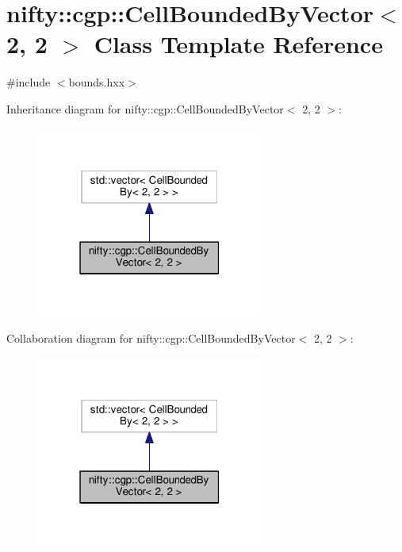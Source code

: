 \hypertarget{classnifty_1_1cgp_1_1CellBoundedByVector_3_012_00_012_01_4}{}\section{nifty\+:\+:cgp\+:\+:Cell\+Bounded\+By\+Vector$<$ 2, 2 $>$ Class Template Reference}
\label{classnifty_1_1cgp_1_1CellBoundedByVector_3_012_00_012_01_4}


{\ttfamily \#include $<$bounds.\+hxx$>$}



Inheritance diagram for nifty\+:\+:cgp\+:\+:Cell\+Bounded\+By\+Vector$<$ 2, 2 $>$\+:\nopagebreak
\begin{figure}[H]
\begin{center}
\leavevmode
\includegraphics[width=211pt]{classnifty_1_1cgp_1_1CellBoundedByVector_3_012_00_012_01_4__inherit__graph}
\end{center}
\end{figure}


Collaboration diagram for nifty\+:\+:cgp\+:\+:Cell\+Bounded\+By\+Vector$<$ 2, 2 $>$\+:\nopagebreak
\begin{figure}[H]
\begin{center}
\leavevmode
\includegraphics[width=211pt]{classnifty_1_1cgp_1_1CellBoundedByVector_3_012_00_012_01_4__coll__graph}
\end{center}
\end{figure}
